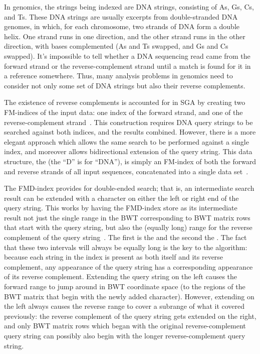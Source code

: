 In genomics, the strings being indexed are DNA strings, consisting of As, Gs, Cs, and Ts. These DNA strings are usually excerpts from double-stranded DNA genomes, in which, for each chromosome, two strands of DNA form a double helix. One strand runs in one direction, and the other strand runs in the other direction, with bases complemented (As and Ts swapped, and Gs and Cs swapped). It's impossible to tell whether a DNA sequencing read came from the forward strand or the reverse-complement strand until a match is found for it in a reference somewhere. Thus, many analysis problems in genomics need to consider not only some set of DNA strings but also their reverse complements.

The existence of reverse complements is accounted for in SGA by creating two FM-indices of the input data: one index of the forward strand, and one of the reverse-complement strand~\cite{simpson2012efficient}. This construction requires DNA query strings to be searched against both indices, and the results combined. However, there is a more elegant approach which allows the same search to be performed against a single index, and moreover allows bidirectional extension of the query string. This data structure, the  (the ``D'' is for ``DNA''), is simply an FM-index of both the forward and reverse strands of all input sequences, concatenated into a single data set~\cite{li2012exploring}.

The FMD-index provides for double-ended search; that is, an intermediate search result can be extended with a character on either the left or right end of the query string. This works by having the FMD-index store as its intermediate result not just the single range in the BWT corresponding to BWT matrix rows that start with the query string, but also the (equally long) range for the reverse complement of the query string~\cite{li2012exploring}. The first is the  and the second the . The fact that these two intervals will always be equally long is the key to the algorithm: because each string in the index is present as both itself and its reverse complement, any appearance of the query string has a corresponding appearance of its reverse complement. Extending the query string on the left causes the forward range to jump around in BWT coordinate space (to the regions of the BWT matrix that begin with the newly added character). However, extending on the left always causes the reverse range to cover a subrange of what it covered previously: the reverse complement of the query string gets extended on the right, and only BWT matrix rows which began with the original reverse-complement query string can possibly also begin with the longer reverse-complement query string.

